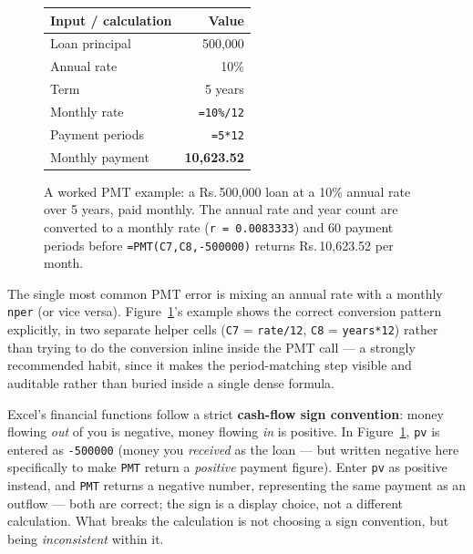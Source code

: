 \documentclass[11pt,a4paper]{article}
\begin{document}
\begin{figure}[h]
\centering
\begin{tcolorbox}[width=0.62\linewidth,colback=excelgreenlight,colframe=excelgreen,boxrule=0.6pt,arc=1pt]
\centering\small
\begin{tabular}{@{}lr@{}}
\toprule
\textbf{Input / calculation} & \textbf{Value} \\
\midrule
Loan principal & 500,000 \\
Annual rate & 10\% \\
Term & 5 years \\
Monthly rate & \texttt{=10\%/12} \\
Payment periods & \texttt{=5*12} \\
\midrule
Monthly payment & \textbf{10,623.52} \\
\bottomrule
\end{tabular}
\end{tcolorbox}
\caption{A worked PMT example: a Rs.\,500,000 loan at a 10\% annual rate over 5 years, paid monthly. The annual rate and year count are converted to a monthly rate (\texttt{r = 0.0083333}) and 60 payment periods before \texttt{=PMT(C7,C8,-500000)} returns Rs.\,10,623.52 per month.}
\label{fig:pmt}
\end{figure}

\begin{keyconcept}
The single most common PMT error is mixing an annual rate with a monthly \texttt{nper} (or vice versa). Figure~\ref{fig:pmt}'s example shows the correct conversion pattern explicitly, in two separate helper cells (\texttt{C7} = \texttt{rate/12}, \texttt{C8} = \texttt{years*12}) rather than trying to do the conversion inline inside the PMT call --- a strongly recommended habit, since it makes the period-matching step visible and auditable rather than buried inside a single dense formula.
\end{keyconcept}

\begin{keyconcept}
Excel's financial functions follow a strict \textbf{cash-flow sign convention}: money flowing \emph{out} of you is negative, money flowing \emph{in} is positive. In Figure~\ref{fig:pmt}, \texttt{pv} is entered as \texttt{-500000} (money you \emph{received} as the loan --- but written negative here specifically to make \texttt{PMT} return a \emph{positive} payment figure). Enter \texttt{pv} as positive instead, and \texttt{PMT} returns a negative number, representing the same payment as an outflow --- both are correct; the sign is a display choice, not a different calculation. What breaks the calculation is not choosing a sign convention, but being \emph{inconsistent} within it.
\end{keyconcept}
\end{document}
